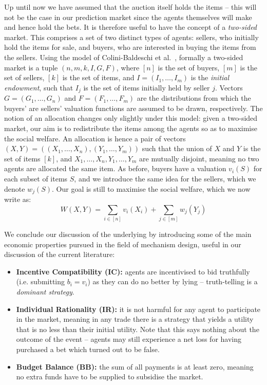 \documentclass[10pt,a4paper]{article}
\theoremstyle{plain}
\theoremstyle{definition}
\begin{document}
	Up until now we have assumed that the auction itself holds the items --
	this will not be the case in our prediction market since the agents
	themselves will make and hence hold the bets. It is therefore useful to
	have the concept of a \emph{two-sided} market. This comprises a set of two
	distinct types of agents: sellers, who initially hold the items for sale,
	and buyers, who are interested in buying the items from the sellers. Using
	the model of Colini-Baldeschi et al.~\cite{ColiniBaldeschi2017}, formally a
	two-sided market is a tuple $(n, m, k, I, G, F)$, where $[n]$ is the set of
	buyers, $[m]$ is the set of sellers, $[k]$ is the set of items, and $I =
	(I_1, \ldots, I_m)$ is the \emph{initial endowment}, such that $I_j$ is the
	set of items initially held by seller $j$. Vectors $G = (G_1, \ldots, G_n)$
	and $F = (F_1, \ldots, F_m)$ are the distributions from which the buyers'
	are sellers' valuation functions are assumed to be drawn, respectively. The
	notion of an allocation changes only slightly under this model: given a
	two-sided market, our aim is to redistribute the items among the agents so
	as to maximise the social welfare. An allocation is hence a pair of vectors
	$(X,Y) = ((X_1, \ldots, X_n), (Y_1, \ldots, Y_m))$ such that the union of
	$X$ and $Y$ is the set of items $[k]$, and $X_1, \ldots, X_n, Y_1, \ldots,
	Y_m$ are mutually disjoint, meaning no two agents are allocated the same
	item. As before, buyers have a valuation $v_i(S)$ for each subset of items
	$S$, and we introduce the same idea for the sellers, which we denote
	$w_j(S)$. Our goal is still to maximise the social welfare, which we now
	write as:
	\begin{equation*}
		W(X, Y) = \sum_{i \in [n]} v_i(X_i) + \sum_{j \in [m]} w_j(Y_j)
	\end{equation*}

	We conclude our discussion of the underlying by introducing some of the
	main economic properties pursued in the field of mechanism design, useful
	in our discussion of the current literature:

	\begin{itemize}
		\item \textbf{Incentive Compatibility (IC):} agents are incentivised to
			bid truthfully (i.e. submitting $b_i = v_i$) as they can do no
			better by lying -- truth-telling is a \emph{dominant strategy}.

		\item \textbf{Individual Rationality (IR):} it is not harmful for any
			agent to participate in the market, meaning in any trade there is a
			strategy that yields a utility that is no less than their initial
			utility. Note that this says nothing about the outcome of the event
			-- agents may still experience a net loss for having purchased a
			bet which turned out to be false.

		\item \textbf{Budget Balance (BB):} the sum of all payments is at least
			zero, meaning no extra funds have to be supplied to subsidise the
			market.

	\end{itemize}
\end{document}
